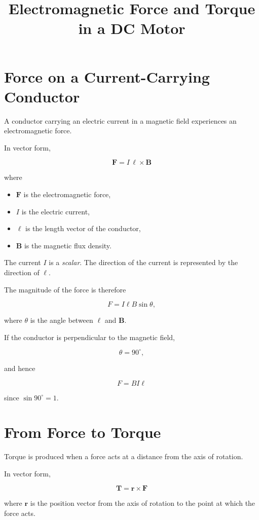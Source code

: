 \documentclass[11pt,a4paper]{article}
\title{Electromagnetic Force and Torque in a DC Motor}
\author{}
\date{}
\begin{document}
\maketitle

\section{Force on a Current-Carrying Conductor}

A conductor carrying an electric current in a magnetic field experiences
an electromagnetic force.

In vector form,

\[
\boxed{
\bm{F}
=
I\,\bm{\ell}\times\bm{B}
}
\]

where

\begin{itemize}
    \item $\bm{F}$ is the electromagnetic force,
    \item $I$ is the electric current,
    \item $\bm{\ell}$ is the length vector of the conductor,
    \item $\bm{B}$ is the magnetic flux density.
\end{itemize}

The current $I$ is a \emph{scalar}.  
The direction of the current is represented by the direction of
$\bm{\ell}$.

The magnitude of the force is therefore

\[
F = I\ell B\sin\theta,
\]

where $\theta$ is the angle between $\bm{\ell}$ and $\bm{B}$.

If the conductor is perpendicular to the magnetic field,

\[
\theta = 90^\circ,
\]

and hence

\[
\boxed{
F = BI\ell
}
\]

since $\sin 90^\circ = 1$.

\section{From Force to Torque}

Torque is produced when a force acts at a distance from the axis of
rotation.

In vector form,

\[
\boxed{
\bm{T}
=
\bm{r}\times\bm{F}
}
\]

where $\bm{r}$ is the position vector from the axis of rotation to the
point at which the force acts.
\end{document}
